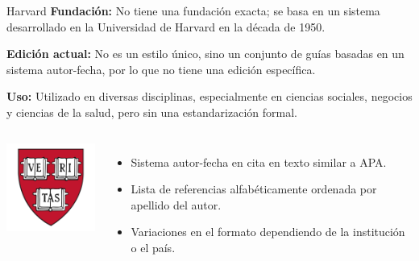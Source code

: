\documentclass[
11pt, %
]{beamer}
\begin{document}
\begin{frame}{Harvard}
	\textbf{Fundación:} No tiene una fundación exacta; se basa en un sistema desarrollado en la Universidad de Harvard en la década de 1950.

	\textbf{Edición actual:} No es un estilo único, sino un conjunto de guías basadas en un sistema autor-fecha, por lo que no tiene una edición específica.

	\textbf{Uso:} Utilizado en diversas disciplinas, especialmente en ciencias sociales, negocios y ciencias de la salud, pero sin una estandarización formal.
	\vspace{0.5cm}
	\begin{columns}[T]
		\centering
		\includegraphics[width=3.5cm]{harvard logo.png} %
		\begin{itemize}
			\item Sistema autor-fecha en cita en texto similar a APA.
			\item Lista de referencias alfabéticamente ordenada por apellido del autor.
			\item Variaciones en el formato dependiendo de la institución o el país.
		\end{itemize}
	\end{columns}
\end{frame}
\end{document}
